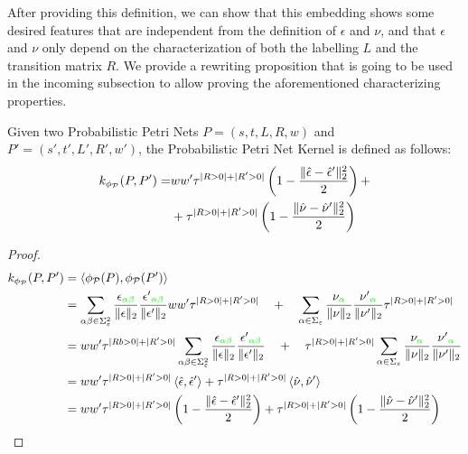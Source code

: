 After providing this definition, we can show that this embedding shows some desired features that are independent from the definition of $\epsilon$ and $\nu$, and that $\epsilon$ and $\nu$ only depend on the characterization of both the labelling $L$ and the transition matrix $R$. We provide a rewriting proposition that is going to be used in the incoming subsection to allow proving the aforementioned characterizing properties.

\begin{proposition}\label{lem:rewritinglemma}
Given two Probabilistic Petri Nets $P=(s,t,L,R,w)$ and $P'=(s',t',L',R',w')$, the Probabilistic Petri Net Kernel is defined as follows:
$$\begin{aligned}
k_{\phi_{\mathcal{P}}}(P,P')=&ww'\tau^{|R>0|+|R'>0|}\left(1-\frac{\|\hat{\epsilon}-\hat{\epsilon}'\|_{2}^2}{2}\right)+\\
	&+\tau^{|R>0|+|R'>0|}\left(1-\frac{\|\hat{\nu}-\hat{\nu}'\|_{2}^2}{2}\right)\\
\end{aligned}$$
\end{proposition}
\begin{proof}
$$\begin{aligned}
k_{\phi_{\mathcal{P}}}(P,P')&=\Braket{\phi_{\mathcal{P}}(P),\phi_{\mathcal{P}}(P')}\\
	&=\sum_{\alpha\beta\in \Sigma_\varepsilon^2}\frac{\epsilon_{\color{green}\alpha\beta}}{\|\epsilon\|_2}\frac{{\epsilon'}_{\color{green}\alpha\beta}}{\|\epsilon'\|_2}ww'\tau^{|R>0|+|R'>0|}\quad+\quad \sum_{\alpha\in \Sigma_\varepsilon}\frac{\nu_{\color{green}\alpha}}{\|\nu\|_2}\frac{{\nu'}_{\color{green}\alpha}}{\|\nu'\|_2}\tau^{|R>0|+|R'>0|}\\
	&=ww'\tau^{|Rb>0|+|R'>0|}\sum_{\alpha\beta\in \Sigma_\varepsilon^2}\frac{\epsilon_{\color{green}\alpha\beta}}{\|\epsilon\|_2}\frac{{\epsilon'}_{\color{green}\alpha\beta}}{\|\epsilon'\|_2}\quad+\quad \tau^{|R>0|+|R'>0|}\sum_{\alpha\in \Sigma_\varepsilon}\frac{\nu_{\color{green}\alpha}}{\|\nu\|_2}\frac{{\nu'}_{\color{green}\alpha}}{\|\nu'\|_2}\\
	&=ww'\tau^{|R>0|+|R'>0|}\Braket{\hat{\epsilon}, \hat{\epsilon}'}+ \tau^{|R>0|+|R'>0|}\Braket{\hat{\nu}, \hat{\nu}'}\\
	&=ww'\tau^{|R>0|+|R'>0|}\left(1-\frac{\|\hat{\epsilon}- \hat{\epsilon}'\|_{2}^2}{2}\right)+ \tau^{|R>0|+|R'>0|}\left(1-\frac{\|\hat{\nu}- \hat{\nu}'\|_{2}^2}{2}\right)\\
\end{aligned}$$
\end{proof}

